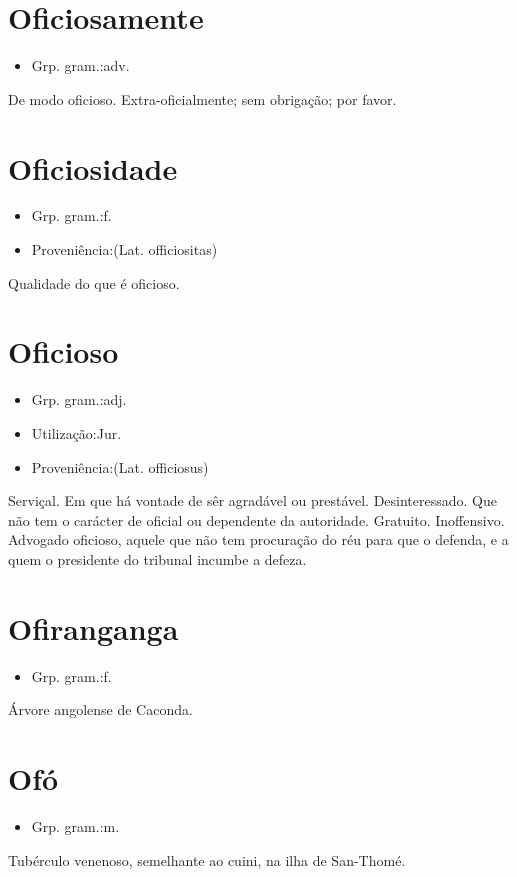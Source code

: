 \section{Oficiosamente}
\begin{itemize}
\item {Grp. gram.:adv.}
\end{itemize}
De modo oficioso.
Extra-oficialmente; sem obrigação; por favor.
\section{Oficiosidade}
\begin{itemize}
\item {Grp. gram.:f.}
\end{itemize}
\begin{itemize}
\item {Proveniência:(Lat. \textunderscore officiositas\textunderscore )}
\end{itemize}
Qualidade do que é oficioso.
\section{Oficioso}
\begin{itemize}
\item {Grp. gram.:adj.}
\end{itemize}
\begin{itemize}
\item {Utilização:Jur.}
\end{itemize}
\begin{itemize}
\item {Proveniência:(Lat. \textunderscore officiosus\textunderscore )}
\end{itemize}
Serviçal.
Em que há vontade de sêr agradável ou prestável.
Desinteressado.
Que não tem o carácter de oficial ou dependente da autoridade.
Gratuito.
Inoffensivo.
Advogado \textunderscore oficioso\textunderscore , aquele que não tem procuração do réu para que o defenda, e a quem o presidente do tribunal incumbe a defeza.
\section{Ofiranganga}
\begin{itemize}
\item {Grp. gram.:f.}
\end{itemize}
Árvore angolense de Caconda.
\section{Ofó}
\begin{itemize}
\item {Grp. gram.:m.}
\end{itemize}
Tubérculo venenoso, semelhante ao cuini, na ilha de San-Thomé.
